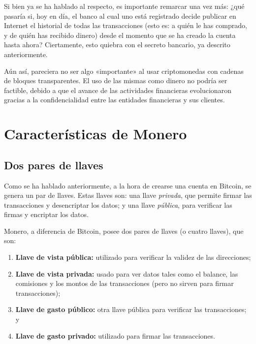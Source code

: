 \documentclass[12pt,a4paper,twoside]{book}
\begin{document}
Si bien ya se ha hablado al respecto, es importante remarcar una vez más: ¿qué pasaría si, hoy en día, el banco al cual uno está registrado decide publicar en Internet el historial de todas las transacciones (esto es: a quién le has comprado, y de quién has recibido dinero) desde el momento que se ha creado la cuenta hasta ahora? Ciertamente, esto quiebra con el secreto bancario, ya descrito anteriormente.

Aún así, pareciera no ser algo «importante» al usar criptomonedas con cadenas de bloques transparentes. El uso de las mismas como dinero no podría ser factible, debido a que el avance de las actividades financieras evolucionaron gracias a la confidencialidad entre las entidades financieras y sus clientes.

\section{Características de Monero}

\subsection{Dos pares de llaves}
Como se ha hablado anteriormente, a la hora de crearse una cuenta en Bitcoin, se genera un par de llaves. Estas llaves son: una llave \textit{privada}, que permite firmar las transacciones y desencriptar los datos; y una llave \textit{pública}, para verificar las firmas y encriptar los datos.

Monero, a diferencia de Bitcoin, posee dos pares de llaves (o cuatro llaves), que son:

\begin{enumerate}
\item \textbf{Llave de vista pública:} utilizado para verificar la validez de las direcciones;
\item \textbf{Llave de vista privada:} usado para ver datos tales como el balance, las comisiones y los montos de las transacciones (pero no sirven para firmar transacciones);
\item \textbf{Llave de gasto público:} otra llave pública para verificar las transacciones; y
\item \textbf{Llave de gasto privado:} utilizado para firmar las transacciones.
\end{enumerate}
\end{document}

